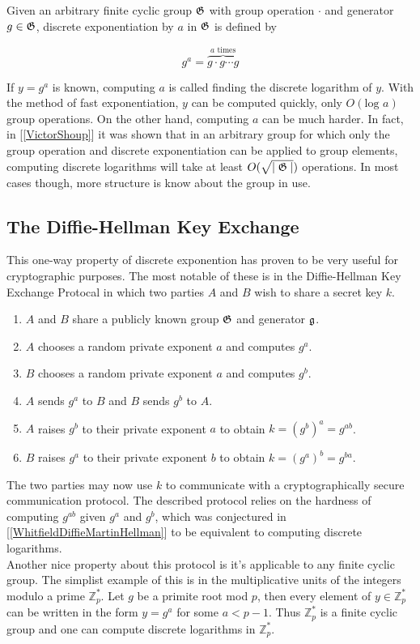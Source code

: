 Given an arbitrary finite cyclic group $\mathfrak{G}$ with group operation $\cdot$ and generator $g \in \mathfrak{G}$, discrete exponentiation by $a$ in $\mathfrak{G}$ is defined by 

$$
g^a = \overbrace{g \cdot g \cdots g}^{a \text{ times}}
$$

If $y = g^a$ is known, computing $a$ is called finding the discrete logarithm of $y$. With the method of fast exponentiation, $y$ can be computed quickly, only $O(\text{log } a)$ group operations. On the other hand, computing $a$ can be much harder. In fact, in [\ref{VictorShoup}] it was shown that in an arbitrary group for which only the group operation and discrete exponentiation can be applied to group elements, computing discrete logarithms will take at least $O(\sqrt{\mid \mathfrak{G} \mid})$ operations. In most cases though, more structure is know about the group in use. 

\subsection{The Diffie-Hellman Key Exchange}

This one-way property of discrete exponention has proven to be very useful for cryptographic purposes. The most notable of these is in the Diffie-Hellman Key Exchange Protocal in which two parties $A$ and $B$ wish to share a secret key $k$. 

\begin{enumerate}[1.]
	\item $A$ and $B$ share a publicly known group $\mathfrak{G}$ and generator $\mathfrak{g}$. 
	\item $A$ chooses a random private exponent $a$ and computes $g^a$.
	\item $B$ chooses a random private exponent $a$ and computes $g^b$.
	\item $A$ sends $g^a$ to $B$ and $B$ sends $g^b$ to $A$. 
	\item $A$ raises $g^b$ to their private exponent $a$ to obtain $k = (g^b)^a = g^{ab}$.
	\item $B$ raises $g^a$ to their private exponent $b$ to obtain $k = (g^a)^b = g^{ba}$.
\end{enumerate}

The two parties may now use $k$ to communicate with a cryptographically secure communication protocol. The described protocol relies on the hardness of computing $g^{ab}$ given $g^a$ and $g^b$, which was conjectured in [\ref{WhitfieldDiffieMartinHellman}] to be equivalent to computing discrete logarithms. \\ 

Another nice property about this protocol is it's applicable to any finite cyclic group. The simplist example of this is in the multiplicative units of the integers modulo a prime $\mathbb{Z}_p^*$. Let $g$ be a primite root mod $p$, then every element of $y \in \mathbb{Z}_p^*$ can be written in the form $y = g^a$ for some $a < p-1$. Thus $\mathbb{Z}_p^*$ is a finite cyclic group and one can compute discrete logarithms in $\mathbb{Z}_p^*$. 





